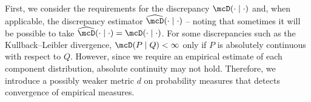 First, we consider the requirements for the discrepancy $\discr{\cdot}{\cdot}$ and, when applicable, the discrepancy estimator $\discrest{\cdot}{\cdot}$
-- noting that sometimes it will be possible to take $\discrest{\cdot}{\cdot} = \discr{\cdot}{\cdot}$.
For some discrepancies such as the Kullback--Leibler divergence, $\discr{P}{Q} < \infty$ only if $P$ is absolutely continuous with respect to $Q$.
However, since we require an empirical estimate of each component distribution, absolute continuity may not hold.
Therefore, we introduce a possibly weaker metric $d$ on probability measures that detects convergence of empirical measures.
